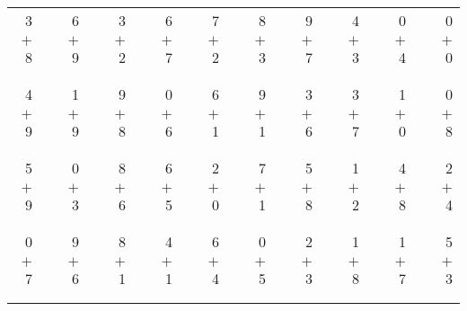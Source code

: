 \documentclass[12pt, letterpaper]{article}
\begin{document}
\begin{tabular}{rrrrrrrrrrrrrrrrrrr}
3 & & 6 & & 3 & & 6 & & 7 & & 8 & & 9 & & 4 & & 0 & & 0\\
$+$ 8 & & $+$ 9 & & $+$ 2 & & $+$ 7 & & $+$ 2 & & $+$ 3 & & $+$ 7 & & $+$ 3 & & $+$ 4 & & $+$ 0\\
\cline{1-1} \cline{3-3} \cline{5-5} \cline{7-7} \cline{9-9} \cline{11-11} \cline{13-13} \cline{15-15} \cline{17-17} \cline{19-19} \\ \\
4 & & 1 & & 9 & & 0 & & 6 & & 9 & & 3 & & 3 & & 1 & & 0\\
$+$ 9 & & $+$ 9 & & $+$ 8 & & $+$ 6 & & $+$ 1 & & $+$ 1 & & $+$ 6 & & $+$ 7 & & $+$ 0 & & $+$ 8\\
\cline{1-1} \cline{3-3} \cline{5-5} \cline{7-7} \cline{9-9} \cline{11-11} \cline{13-13} \cline{15-15} \cline{17-17} \cline{19-19} \\ \\
5 & & 0 & & 8 & & 6 & & 2 & & 7 & & 5 & & 1 & & 4 & & 2\\
$+$ 9 & & $+$ 3 & & $+$ 6 & & $+$ 5 & & $+$ 0 & & $+$ 1 & & $+$ 8 & & $+$ 2 & & $+$ 8 & & $+$ 4\\
\cline{1-1} \cline{3-3} \cline{5-5} \cline{7-7} \cline{9-9} \cline{11-11} \cline{13-13} \cline{15-15} \cline{17-17} \cline{19-19} \\ \\
0 & & 9 & & 8 & & 4 & & 6 & & 0 & & 2 & & 1 & & 1 & & 5\\
$+$ 7 & & $+$ 6 & & $+$ 1 & & $+$ 1 & & $+$ 4 & & $+$ 5 & & $+$ 3 & & $+$ 8 & & $+$ 7 & & $+$ 3\\
\cline{1-1} \cline{3-3} \cline{5-5} \cline{7-7} \cline{9-9} \cline{11-11} \cline{13-13} \cline{15-15} \cline{17-17} \cline{19-19} \\ \\
\end{tabular}
\newpage
\end{document}
